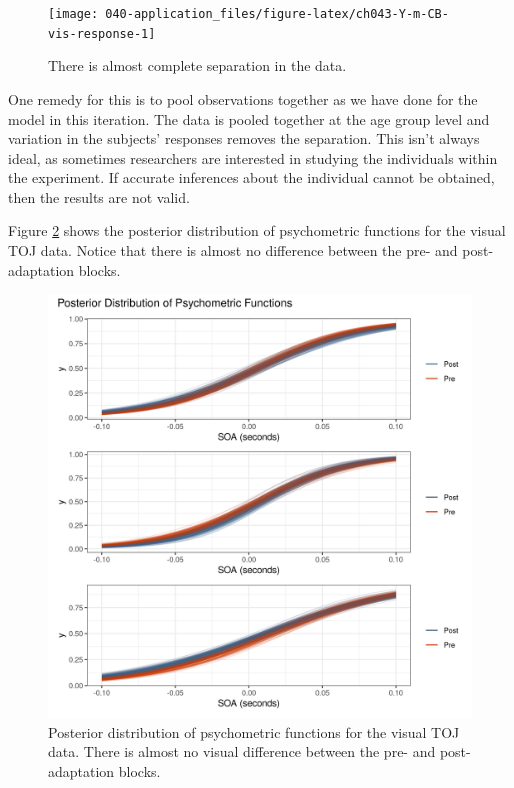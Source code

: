 \documentclass[11pt, oneside, openany]{scrbook}
\begin{document}
\begin{figure}

{\centering \texttt{[image: 040-application\_files/figure-latex/ch043-Y-m-CB-vis-response-1]} 

}

\caption{There is almost complete separation in the data.}\label{fig:ch043-Y-m-CB-vis-response}
\end{figure}

One remedy for this is to pool observations together as we have done for the model in this iteration. The data is pooled together at the age group level and variation in the subjects' responses removes the separation. This isn't always ideal, as sometimes researchers are interested in studying the individuals within the experiment. If accurate inferences about the individual cannot be obtained, then the results are not valid.

Figure \ref{fig:ch043-Iron-Intensive} shows the posterior distribution of psychometric functions for the visual TOJ data. Notice that there is almost no difference between the pre- and post-adaptation blocks.

\begin{figure}

{\centering \includegraphics[width=0.85\linewidth]{figures/ch043-Iron-Intensive} 

}

\caption{Posterior distribution of psychometric functions for the visual TOJ data. There is almost no visual difference between the pre- and post-adaptation blocks.}\label{fig:ch043-Iron-Intensive}
\end{figure}
\end{document}

